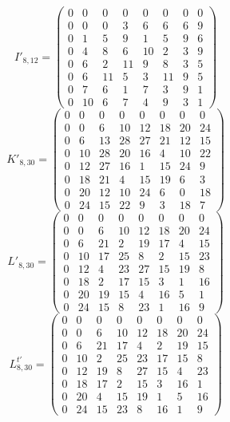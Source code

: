 \documentclass[11pt]{amsart}
\begin{document}
{\setlength{\arraycolsep}{4pt}$$I'_{8,12}=\begin{pmatrix}0 & 0 & 0 & 0 & 0 & 0 & 0 & 0\\ 0 & 0 & 0 & 3 & 6 & 6 & 6 & 9\\ 0 & 1 & 5 & 9 & 1 & 5 & 9 & 6\\ 0 & 4 & 8 & 6 & 10 & 2 & 3 & 9\\ 0 & 6 & 2 & 11 & 9 & 8 & 3 & 5\\ 0 & 6 & 11 & 5 & 3 & 11 & 9 & 5\\ 0 & 7 & 6 & 1 & 7 & 3 & 9 & 1\\ 0 & 10 & 6 & 7 & 4 & 9 & 3 & 1\end{pmatrix}$$}
{\setlength{\arraycolsep}{4pt}$$K'_{8,30}=\begin{pmatrix}0 & 0 & 0 & 0 & 0 & 0 & 0 & 0\\ 0 & 0 & 6 & 10 & 12 & 18 & 20 & 24\\ 0 & 6 & 13 & 28 & 27 & 21 & 12 & 15\\ 0 & 10 & 28 & 20 & 16 & 4 & 10 & 22\\ 0 & 12 & 27 & 16 & 1 & 15 & 24 & 9\\ 0 & 18 & 21 & 4 & 15 & 19 & 6 & 3\\ 0 & 20 & 12 & 10 & 24 & 6 & 0 & 18\\ 0 & 24 & 15 & 22 & 9 & 3 & 18 & 7\end{pmatrix}$$}
{\setlength{\arraycolsep}{4pt}$$L'_{8,30}=\begin{pmatrix}0 & 0 & 0 & 0 & 0 & 0 & 0 & 0\\ 0 & 0 & 6 & 10 & 12 & 18 & 20 & 24\\ 0 & 6 & 21 & 2 & 19 & 17 & 4 & 15\\ 0 & 10 & 17 & 25 & 8 & 2 & 15 & 23\\ 0 & 12 & 4 & 23 & 27 & 15 & 19 & 8\\ 0 & 18 & 2 & 17 & 15 & 3 & 1 & 16\\ 0 & 20 & 19 & 15 & 4 & 16 & 5 & 1\\ 0 & 24 & 15 & 8 & 23 & 1 & 16 & 9\end{pmatrix}$$}
{\setlength{\arraycolsep}{4pt}$$L^{t\prime}_{8,30}=\begin{pmatrix}0 & 0 & 0 & 0 & 0 & 0 & 0 & 0\\ 0 & 0 & 6 & 10 & 12 & 18 & 20 & 24\\ 0 & 6 & 21 & 17 & 4 & 2 & 19 & 15\\ 0 & 10 & 2 & 25 & 23 & 17 & 15 & 8\\ 0 & 12 & 19 & 8 & 27 & 15 & 4 & 23\\ 0 & 18 & 17 & 2 & 15 & 3 & 16 & 1\\ 0 & 20 & 4 & 15 & 19 & 1 & 5 & 16\\ 0 & 24 & 15 & 23 & 8 & 16 & 1 & 9\end{pmatrix}$$}
\end{document}

